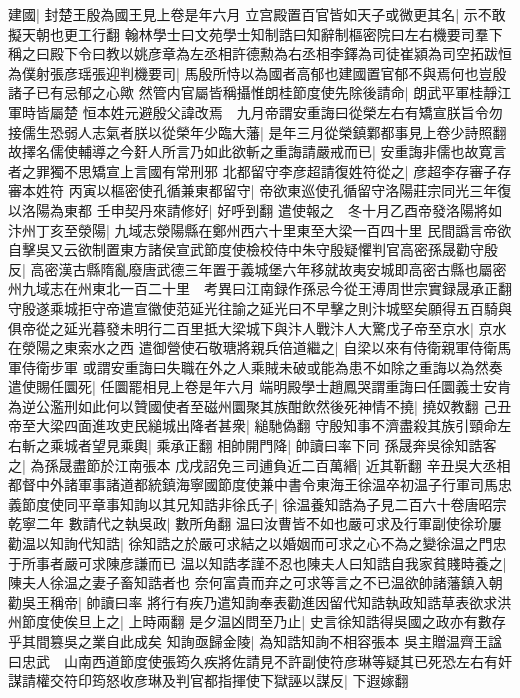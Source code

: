 建國|{
	封楚王殷為國王見上卷是年六月}
立宫殿置百官皆如天子或微更其名|{
	示不敢擬天朝也更工行翻}
翰林學士曰文苑學士知制誥曰知辭制樞密院曰左右機要司羣下稱之曰殿下令曰教以姚彦章為左丞相許德勲為右丞相李鐸為司徒崔潁為司空拓跋恒為僕射張彦瑶張迎判機要司|{
	馬殷所恃以為國者高郁也建國置官郁不與焉何也豈殷諸子已有忌郁之心歟}
然管内官屬皆稱攝惟朗桂節度使先除後請命|{
	朗武平軍桂靜江軍時皆屬楚}
恒本姓元避殷父諱改焉　九月帝謂安重誨曰從榮左右有矯宣朕旨令勿接儒生恐弱人志氣者朕以從榮年少臨大藩|{
	是年三月從榮鎮鄴都事見上卷少詩照翻}
故擇名儒使輔導之今姧人所言乃如此欲斬之重誨請嚴戒而已|{
	安重誨非儒也故寛言者之罪獨不思矯宣上言國有常刑邪}
北都留守李彦超請復姓符從之|{
	彦超李存審子存審本姓符}
丙寅以樞密使孔循兼東都留守|{
	帝欲東巡使孔循留守洛陽莊宗同光三年復以洛陽為東都}
壬申契丹來請修好|{
	好呼到翻}
遣使報之　冬十月乙酉帝發洛陽將如汴州丁亥至滎陽|{
	九域志滎陽縣在鄭州西六十里東至大梁一百四十里}
民間譌言帝欲自擊吳又云欲制置東方諸侯宣武節度使檢校侍中朱守殷疑懼判官高密孫晟勸守殷反|{
	高密漢古縣隋亂廢唐武德三年置于義城堡六年移就故夷安城即高密古縣也屬密州九域志在州東北一百二十里　考異曰江南録作孫忌今從王溥周世宗實録晟承正翻}
守殷遂乘城拒守帝遣宣徽使范延光往諭之延光曰不早擊之則汴城堅矣願得五百騎與俱帝從之延光暮發未明行二百里抵大梁城下與汴人戰汴人大驚戊子帝至京水|{
	京水在滎陽之東索水之西}
遣御營使石敬瑭將親兵倍道繼之|{
	自梁以來有侍衛親軍侍衛馬軍侍衛步軍}
或謂安重誨曰失職在外之人乘賊未破或能為患不如除之重誨以為然奏遣使賜任圜死|{
	任圜罷相見上卷是年六月}
端明殿學士趙鳳哭謂重誨曰任圜義士安肯為逆公濫刑如此何以贊國使者至磁州圜聚其族酣飲然後死神情不撓|{
	撓奴教翻}
己丑帝至大梁四面進攻吏民縋城出降者甚衆|{
	縋馳偽翻}
守殷知事不濟盡殺其族引頸命左右斬之乘城者望見乘輿|{
	乘承正翻}
相帥開門降|{
	帥讀曰率下同}
孫晟奔吳徐知誥客之|{
	為孫晟盡節於江南張本}
戊戌詔免三司逋負近二百萬緡|{
	近其靳翻}
辛丑吳大丞相都督中外諸軍事諸道都統鎮海寧國節度使兼中書令東海王徐温卒初温子行軍司馬忠義節度使同平章事知詢以其兄知誥非徐氏子|{
	徐温養知誥為子見二百六十卷唐昭宗乾寧二年}
數請代之執吳政|{
	數所角翻}
温曰汝曹皆不如也嚴可求及行軍副使徐玠屢勸温以知詢代知誥|{
	徐知誥之於嚴可求結之以婚姻而可求之心不為之變徐温之門忠于所事者嚴可求陳彦謙而已}
温以知誥孝謹不忍也陳夫人曰知誥自我家貧賤時養之|{
	陳夫人徐温之妻子畜知誥者也}
奈何富貴而弃之可求等言之不已温欲帥諸藩鎮入朝勸吳王稱帝|{
	帥讀曰率}
將行有疾乃遣知詢奉表勸進因留代知誥執政知誥草表欲求洪州節度使俟旦上之|{
	上時兩翻}
是夕温凶問至乃止|{
	史言徐知誥得吳國之政亦有數存乎其間篡吳之業自此成矣}
知詢亟歸金陵|{
	為知誥知詢不相容張本}
吳主贈温齊王諡曰忠武　山南西道節度使張筠久疾將佐請見不許副使符彦琳等疑其已死恐左右有奸謀請權交符印筠怒收彦琳及判官都指揮使下獄誣以謀反|{
	下遐嫁翻}
